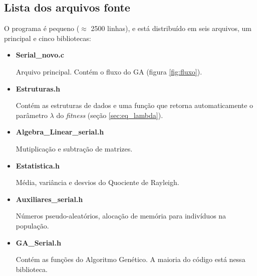\subsection{Lista dos arquivos fonte}
	
	O programa é pequeno ($\approx$ 2500 linhas), e está distribuído em seis arquivos, um principal e cinco bibliotecas:
	
	\begin{itemize}
		\item \textbf{Serial\_novo.c}
		
		Arquivo principal. Contém o fluxo do GA (figura \ref{fig:fluxo}).
		
		\item \textbf{Estruturas.h}
		
		Contém as estruturas de dados e uma função que retorna automaticamente o parâmetro $\lambda$ do \emph{fitness} (seção \ref{sec:eq_lambda}).
		
		\item \textbf{Algebra\_Linear\_serial.h}
		
		Mutiplicação e subtração de matrizes.
		
		\item \textbf{Estatistica.h}
		
		Média, variância e desvios do Quociente de Rayleigh.
		
		\item \textbf{Auxiliares\_serial.h}
		
		Números pseudo-aleatórios, alocação de memória para indivíduos na população.
		
		\item \textbf{GA\_Serial.h}
		
		Contém as funções do Algoritmo Genético. A maioria do código está nessa biblioteca.	
		
	\end{itemize}
					

